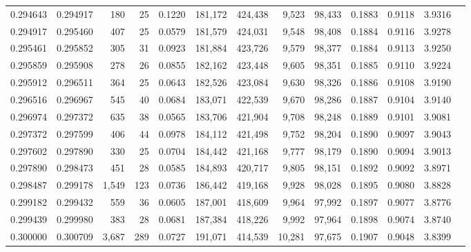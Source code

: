 \begin{tabular}{rrrrrrrrrrrrr}
0.294643 & 0.294917 &   180 &  25 &                                     0.1220 & 181,172 & 424,438 &   9,523 &  98,433 & 0.1883 & 0.9118 & 3.9316 \\
0.294917 & 0.295460 &   407 &  25 &                                     0.0579 & 181,579 & 424,031 &   9,548 &  98,408 & 0.1884 & 0.9116 & 3.9278 \\
0.295461 & 0.295852 &   305 &  31 &                                     0.0923 & 181,884 & 423,726 &   9,579 &  98,377 & 0.1884 & 0.9113 & 3.9250 \\
0.295859 & 0.295908 &   278 &  26 &                                     0.0855 & 182,162 & 423,448 &   9,605 &  98,351 & 0.1885 & 0.9110 & 3.9224 \\
0.295912 & 0.296511 &   364 &  25 &                                     0.0643 & 182,526 & 423,084 &   9,630 &  98,326 & 0.1886 & 0.9108 & 3.9190 \\
0.296516 & 0.296967 &   545 &  40 &                                     0.0684 & 183,071 & 422,539 &   9,670 &  98,286 & 0.1887 & 0.9104 & 3.9140 \\
0.296974 & 0.297372 &   635 &  38 &                                     0.0565 & 183,706 & 421,904 &   9,708 &  98,248 & 0.1889 & 0.9101 & 3.9081 \\
0.297372 & 0.297599 &   406 &  44 &                                     0.0978 & 184,112 & 421,498 &   9,752 &  98,204 & 0.1890 & 0.9097 & 3.9043 \\
0.297602 & 0.297890 &   330 &  25 &                                     0.0704 & 184,442 & 421,168 &   9,777 &  98,179 & 0.1890 & 0.9094 & 3.9013 \\
0.297890 & 0.298473 &   451 &  28 &                                     0.0585 & 184,893 & 420,717 &   9,805 &  98,151 & 0.1892 & 0.9092 & 3.8971 \\
0.298487 & 0.299178 & 1,549 & 123 &                                     0.0736 & 186,442 & 419,168 &   9,928 &  98,028 & 0.1895 & 0.9080 & 3.8828 \\
0.299182 & 0.299432 &   559 &  36 &                                     0.0605 & 187,001 & 418,609 &   9,964 &  97,992 & 0.1897 & 0.9077 & 3.8776 \\
0.299439 & 0.299980 &   383 &  28 &                                     0.0681 & 187,384 & 418,226 &   9,992 &  97,964 & 0.1898 & 0.9074 & 3.8740 \\
0.300000 & 0.300709 & 3,687 & 289 &                                     0.0727 & 191,071 & 414,539 &  10,281 &  97,675 & 0.1907 & 0.9048 & 3.8399 \\

\end{tabular}
